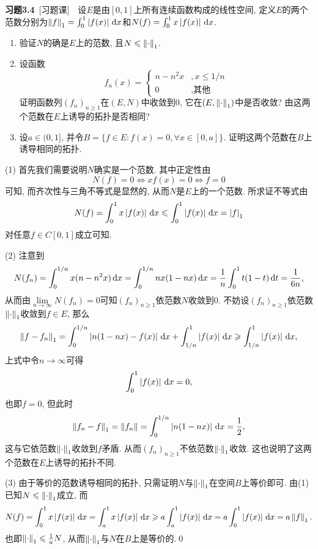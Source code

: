 	\textbf{习题3.4}\ [习题课]\ \ 设$ E $是由$ [0,1] $上所有连续函数构成的线性空间, 定义$ E $的两个范数分别为$ \left\| f \right\|_1=\int_0^1\left| f(x) \right| \,\mathrm{d} x $和$ N(f)=\int_0^1x\left| f(x) \right| \,\mathrm{d} x $.
	\begin{enumerate}[(1)]
	\item 验证$ N $的确是$ E $上的范数, 且$ N\leqslant\left\| \cdot \right\|_1 $.
	\item 设函数
	\[
	f_n(x)=\begin{cases}
	n-n^2x & ,x\leqslant 1/n\\
	0 & ,\text{其他}
	\end{cases}
	\]
	证明函数列$ (f_n)_{n\geqslant 1} $在$ (E,N) $中收敛到0, 它在$ (E,\left\| \cdot \right\|_1) $中是否收敛? 由这两个范数在$ E $上诱导的拓扑是否相同?
	\item 设$ a\in(0,1] $, 并令$ B=\{ f\in E : f(x)=0, \forall x\in[0,a] \} $. 证明这两个范数在$ B $上诱导相同的拓扑.
	\end{enumerate}
	
	\begin{Proof}
	(1) 首先我们需要说明$ N $确实是一个范数. 其中正定性由
	\[
	N(f)=0\Longleftrightarrow xf(x)=0\Longleftrightarrow f=0
	\]
	可知, 而齐次性与三角不等式是显然的, 从而$ N $是$ E $上的一个范数. 所求证不等式由
	\[
	N(f)=\int_0^1x\left| f(x) \right| \,\mathrm{d} x\leqslant\int_0^1\left| f(x) \right| \,\mathrm{d} x=\left| f \right| _1
	\]
	对任意$ f\in C[0,1] $成立可知.
	
	(2) 注意到
	\[
	N(f_n)=\int_0^{1/n}x(n-n^2x)\,\mathrm{d} x=\int_0^{1/n}nx(1-nx)\,\mathrm{d} x=\frac{1}{n}\int_0^1t(1-t)\,\mathrm{d} t=\frac{1}{6n},
	\]
	从而由$ \lim\limits_{n\to\infty}N(f_n)=0 $可知$ (f_n)_{n\geqslant 1} $依范数$ N $收敛到0. 不妨设$ (f_n)_{n\geqslant 1} $依范数$ \left\| \cdot \right\|_1 $收敛到$ f\in E $, 那么
	\[
	\left\| f-f_n \right\|_1=\int_0^{1/n}\left| n(1-nx)-f(x) \right| \,\mathrm{d} x+\int_{1/n}^1\left| f(x) \right| \,\mathrm{d} x\geqslant\int_{1/n}^1\left| f(x) \right| \,\mathrm{d} x,
	\]
	上式中令$ n\to\infty $可得
	\[
	\int_0^1\left| f(x) \right| \,\mathrm{d} x=0,
	\]
	也即$ f=0 $, 但此时
	\[
	\left\| f_n-f \right\|_1=\left\| f_n \right\|=\int_0^{1/n}\left| n(1-nx) \right| \,\mathrm{d} x=\frac{1}{2},
	\]
	这与它依范数$ \left\| \cdot \right\|_1 $收敛到$ f $矛盾. 从而$ (f_n)_{n\geqslant 1} $不依范数$ \left\| \cdot \right\|_1 $收敛. 这也说明了这两个范数在$ E $上诱导的拓扑不同.
	
	(3) 由于等价的范数诱导相同的拓扑, 只需证明$ N $与$ \left\| \cdot \right\|_1 $在空间$ B $上等价即可. 由(1)已知$ N\leqslant\left\| \cdot \right\|_1 $成立, 而
	\[
	N(f)=\int_0^1x\left| f(x) \right| \,\mathrm{d} x=\int_a^1x\left| f(x) \right| \,\mathrm{d} x\geqslant a\int_a^1\left| f(x) \right| \,\mathrm{d} x=a\int_0^1\left| f(x) \right| \,\mathrm{d} x=a\left\| f \right\|_1.
	\]
	也即$ \left\| \cdot \right\|_1\leqslant\frac{1}{a}N $, 从而$ \left\| \cdot \right\|_1 $与$ N $在$ B $上是等价的.\qed
	\end{Proof}

